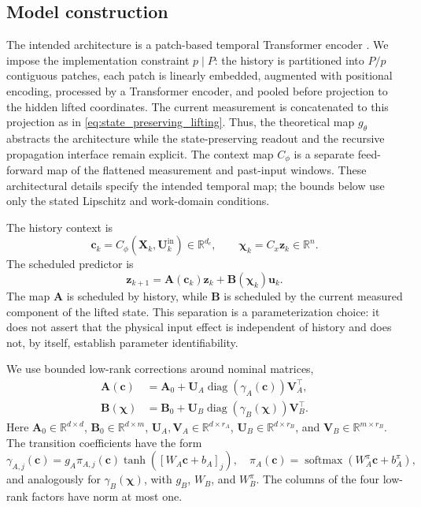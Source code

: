 ﻿\documentclass[journal]{IEEEtran}
\newcommand{\vu}{\mathbf{u}}
\newcommand{\vz}{\mathbf{z}}
\newcommand{\vc}{\mathbf{c}}
\newcommand{\vchi}{\boldsymbol{\chi}}
\newcommand{\mA}{\mathbf{A}}
\newcommand{\mB}{\mathbf{B}}
\newcommand{\mU}{\mathbf{U}}
\newcommand{\mV}{\mathbf{V}}
\newcommand{\mX}{\mathbf{X}}
\newcommand{\R}{\mathbb{R}}
\begin{document}
\subsection{Model construction}

The intended architecture is a patch-based temporal Transformer encoder \cite{vaswani2017attention,nie2023time}. We impose the implementation constraint $p\mid P$: the history is partitioned into $P/p$ contiguous patches, each patch is linearly embedded, augmented with positional encoding, processed by a Transformer encoder, and pooled before projection to the hidden lifted coordinates. The current measurement is concatenated to this projection as in \eqref{eq:state_preserving_lifting}. Thus, the theoretical map $g_\theta$ abstracts the architecture while the state-preserving readout and the recursive propagation interface remain explicit. The context map $C_\phi$ is a separate feed-forward map of the flattened measurement and past-input windows. These architectural details specify the intended temporal map; the bounds below use only the stated Lipschitz and work-domain conditions.

The history context is
\begin{equation}
    \vc_k=C_\phi(\mX_k,\mU_k^{\mathrm{in}})\in\R^{d_c},
    \qquad \vchi_k=C_x\vz_k\in\R^n.
    \label{eq:scheduling_variables}
\end{equation}
The scheduled predictor is
\begin{equation}
    \boxed{\vz_{k+1}=\mA(\vc_k)\vz_k+\mB(\vchi_k)\vu_k.}
    \label{eq:scheduled_predictor}
\end{equation}
The map $\mA$ is scheduled by history, while $\mB$ is scheduled by the current measured component of the lifted state. This separation is a parameterization choice: it does not assert that the physical input effect is independent of history and does not, by itself, establish parameter identifiability.

We use bounded low-rank corrections around nominal matrices,
\begin{align}
    \mA(\vc)&=\mA_0+\mU_A\operatorname{diag}(\gamma_A(\vc))\mV_A^\top,\\
    \mB(\vchi)&=\mB_0+\mU_B\operatorname{diag}(\gamma_B(\vchi))\mV_B^\top.
    \label{eq:low_rank_schedules}
\end{align}
Here $\mA_0\in\R^{d\times d}$, $\mB_0\in\R^{d\times m}$, $\mU_A,\mV_A\in\R^{d\times r_A}$, $\mU_B\in\R^{d\times r_B}$, and $\mV_B\in\R^{m\times r_B}$. The transition coefficients have the form
\begin{equation}
    \gamma_{A,j}(\vc)=g_A\pi_{A,j}(\vc)\tanh([W_A\vc+b_A]_j),
    \quad
    \pi_A(\vc)=\operatorname{softmax}(W_A^\pi\vc+b_A^\pi),
    \label{eq:A_modulation}
\end{equation}
and analogously for $\gamma_B(\vchi)$, with $g_B$, $W_B$, and $W_B^\pi$. The columns of the four low-rank factors have norm at most one.
\end{document}
